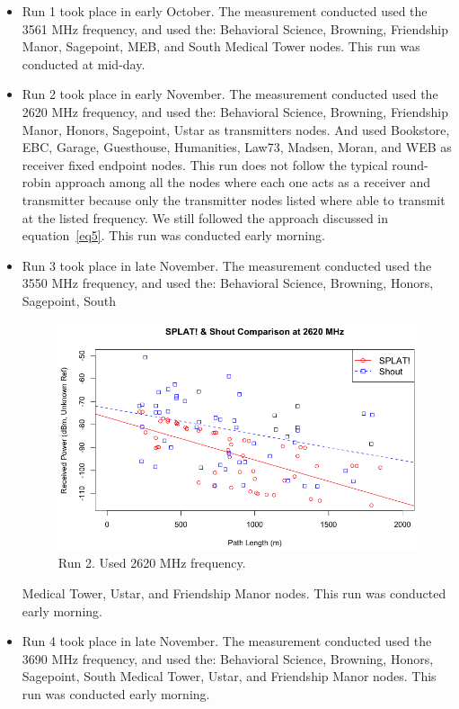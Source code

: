 \begin{itemize}
\item Run 1 took place in early October. The measurement conducted used the 3561 MHz frequency, and used the: Behavioral 
Science, Browning, Friendship Manor, Sagepoint, MEB, and South Medical Tower nodes. This run was conducted at mid-day. 
\item Run 2 took place in early November. The measurement conducted used the 2620 MHz frequency, and used the: Behavioral
Science, Browning, Friendship Manor, Honors, Sagepoint, Ustar as transmitters nodes. And used Bookstore, EBC, Garage, 
Guesthouse, Humanities, Law73, Madsen, Moran, and WEB as receiver fixed endpoint nodes. This run does not follow the 
typical round-robin approach among all the nodes where each one acts as a receiver and transmitter because only the transmitter
nodes listed where able to transmit at the listed frequency. We still followed the approach discussed in equation~\eqref{eq5}.  This run was
conducted early morning. 
\item Run 3 took place in late November. The measurement conducted used the 3550 MHz frequency, and used the: Behavioral
Science, Browning, Honors, Sagepoint, South 

\begin{figure}[htbp]
\centerline{\includegraphics[width=0.9\columnwidth]{figs/2620.png}}
\vspace{-3mm}
\caption{Run 2. Used 2620 MHz frequency.}
\label{2620}
\vspace{-3mm}
\end{figure}

Medical Tower, Ustar, and Friendship Manor nodes. This run was conducted early 
morning. 
\item Run 4 took place in late November. The measurement conducted used the 3690 MHz frequency, and used the: Behavioral 
Science, Browning, Honors, Sagepoint, South Medical Tower, Ustar, and Friendship Manor nodes. This run was conducted early 
morning.
\end{itemize}


